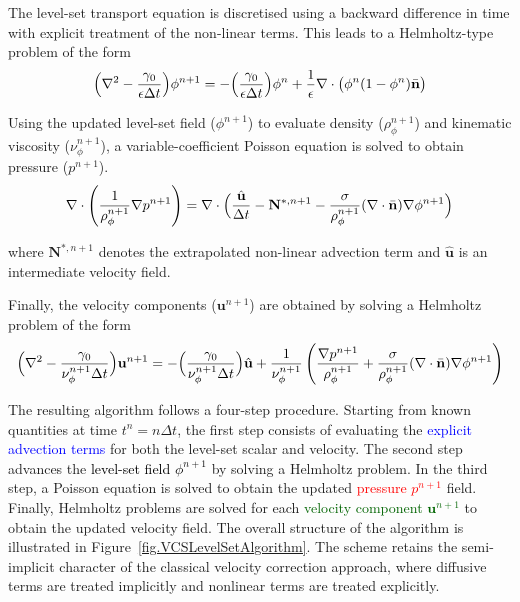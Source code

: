 The level-set transport equation is discretised using a backward difference in time with explicit treatment of the non-linear terms. This leads to a Helmholtz-type problem of the form
\begin{equation}
\Bigl(\nabla^2 - \frac{\gamma_0}{\epsilon \Delta t}\Bigr)\phi^{n+1}
=
-\Bigl(\frac{\gamma_0}{\epsilon \Delta t}\Bigr)\phi^n
+ \frac{1}{\epsilon} \nabla \cdot \bigl(\phi^n(1-\phi^n)\Bar{\mathbf{n}}\bigr)
\label{eqn.LevelSetHelm}
\end{equation}

Using the updated level-set field ($\phi^{n+1}$) to evaluate density ($\rho_{\phi}^{n+1}$) and kinematic viscosity ($\nu_{\phi}^{n+1}$), a variable-coefficient Poisson equation is solved to obtain pressure ($p^{n+1}$).
\begin{equation}
\nabla \cdot \left(\frac{1}{\rho_{\phi}^{n+1}} \nabla p^{n+1}\right)
=
\nabla \cdot \Bigl(
\frac{\hat{\mathbf{u}}}{\Delta t}
- \mathbf{N}^{*,n+1}
- \frac{\sigma}{\rho_{\phi}^{n+1}} (\nabla \cdot \Bar{\mathbf{n}})\nabla \phi^{n+1}
\Bigr)
\label{eqn.LevelSetPressurePoisson}
\end{equation}

where $\mathbf{N}^{*,n+1}$ denotes the extrapolated non-linear advection term and $\hat{\mathbf{u}}$ is an intermediate velocity field.

Finally, the velocity components ($\mathbf{u}^{n+1}$) are obtained by solving a Helmholtz problem of the form
\begin{equation}
\Bigl(\nabla^2 - \frac{\gamma_0}{\nu_{\phi}^{n+1} \Delta t}\Bigr)\mathbf{u}^{n+1}=
-\Bigl(\frac{\gamma_0}{\nu_{\phi}^{n+1} \Delta t}\Bigr)\hat{\mathbf{u}}
+ \frac{1}{\nu_{\phi}^{n+1}}
\left(
\frac{\nabla p^{n+1}}{\rho_{\phi}^{n+1}}
+ \frac{\sigma}{\rho_{\phi}^{n+1}} (\nabla \cdot \Bar{\mathbf{n}})\nabla \phi^{n+1}
\right)
\label{eqn.LevelSetVelocityHelm}
\end{equation}

The resulting algorithm follows a four-step procedure. Starting from known quantities at time $t^n = n\Delta t$, the first step consists of evaluating the \textcolor{blue}{explicit advection terms} for both the level-set scalar and velocity. The second step advances the \textcolor{black}{level-set field $\phi^{n+1}$} by solving a Helmholtz problem. In the third step, a Poisson equation is solved to obtain the updated \textcolor{red}{pressure $p^{n+1}$} field. Finally, Helmholtz problems are solved for each \textcolor{darkgreen}{velocity component $\mathbf{u}^{n+1}$} to obtain the updated velocity field. The overall structure of the algorithm is illustrated in Figure~\ref{fig.VCSLevelSetAlgorithm}. The scheme retains the semi-implicit character of the classical velocity correction approach, where diffusive terms are treated implicitly and nonlinear terms are treated explicitly.

